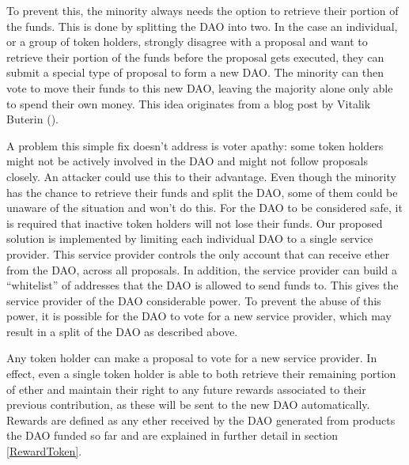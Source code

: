 \documentclass[9pt,oneside]{amsart}
\begin{document}
\begin{multicols}{2}
To prevent this, the minority always needs the option to retrieve their portion of the funds. This is done by splitting the DAO into two. In the case an individual, or a group of token holders, strongly disagree with a proposal and want to retrieve their portion of the funds before the proposal gets executed, they can submit a special type of proposal to form a new DAO. The minority can then vote to move their funds to this new DAO, leaving the majority alone only able to spend their own money.
This idea originates from a blog post by Vitalik Buterin (\cite{Vitalik2015subjectivity}). 

A problem this simple fix doesn’t address is voter apathy: some token holders might not be actively involved in the DAO and might not follow proposals closely. An attacker could use this to their advantage. Even though the minority has the chance to retrieve their funds and split the DAO, some of them could be unaware of the situation and won't do this. For the DAO to be considered safe, it is required that inactive token holders will not lose their funds. Our proposed solution is implemented by limiting each individual DAO to a single service provider. This service provider controls the only account that can receive ether from the DAO, across all proposals. In addition, the service provider can build a “whitelist” of addresses that the DAO is allowed to send funds to. This gives the service provider of the DAO considerable power. To prevent the abuse of this power, it is possible for the DAO to vote for a new service provider, which may result in a split of the DAO as described above. 

Any token holder can make a proposal to vote for a new service provider. In effect, even a single token holder is able to both retrieve their remaining portion of ether and maintain their right to any future rewards associated to their previous contribution, as these will be sent to the new DAO automatically. Rewards are defined as any ether received by the DAO generated from products the DAO funded so far and are explained in further detail in section \ref{RewardToken}.


\end{multicols}
\end{document}
